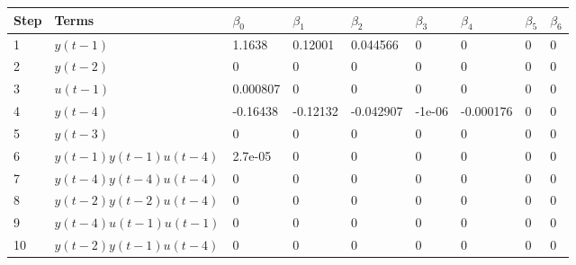 \begin{tabular}{lllllllll}
Step & Terms & $\beta_{0}$ & $\beta_{1}$ & $\beta_{2}$ & $\beta_{3}$ & $\beta_{4}$ & $\beta_{5}$ & $\beta_{6}$ \\ 
\hline 
1 & $y(t-1)$ & 1.1638 & 0.12001 & 0.044566 & 0 & 0 & 0 & 0 \\ 
2 & $y(t-2)$ & 0 & 0 & 0 & 0 & 0 & 0 & 0 \\ 
3 & $u(t-1)$ & 0.000807 & 0 & 0 & 0 & 0 & 0 & 0 \\ 
4 & $y(t-4)$ & -0.16438 & -0.12132 & -0.042907 & -1e-06 & -0.000176 & 0 & 0 \\ 
5 & $y(t-3)$ & 0 & 0 & 0 & 0 & 0 & 0 & 0 \\ 
6 & $y(t-1)y(t-1)u(t-4)$ & 2.7e-05 & 0 & 0 & 0 & 0 & 0 & 0 \\ 
7 & $y(t-4)y(t-4)u(t-4)$ & 0 & 0 & 0 & 0 & 0 & 0 & 0 \\ 
8 & $y(t-2)y(t-2)u(t-4)$ & 0 & 0 & 0 & 0 & 0 & 0 & 0 \\ 
9 & $y(t-4)u(t-1)u(t-1)$ & 0 & 0 & 0 & 0 & 0 & 0 & 0 \\ 
10 & $y(t-2)y(t-1)u(t-4)$ & 0 & 0 & 0 & 0 & 0 & 0 & 0 \\ 
\hline 
\end{tabular}